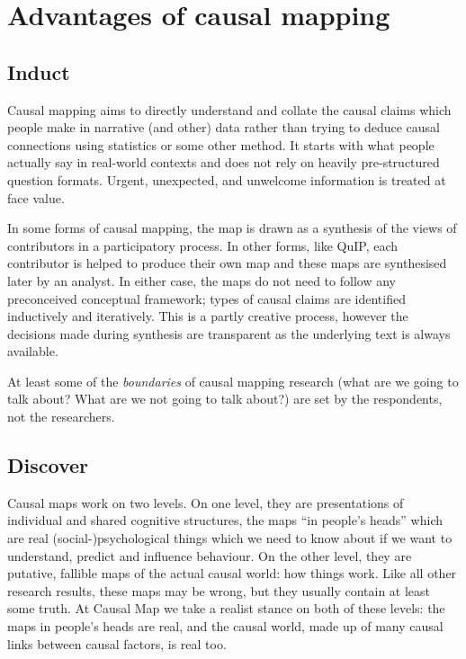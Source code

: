 \documentclass[
]{book}
\begin{document}
\hypertarget{advantages-of-causal-mapping}{%
\section{Advantages of causal mapping}\label{advantages-of-causal-mapping}}

\hypertarget{induct}{%
\subsection{Induct}\label{induct}}

Causal mapping aims to directly understand and collate the causal claims which people make in narrative (and other) data rather than trying to deduce causal connections using statistics or some other method. It starts with what people actually say in real-world contexts and does not rely on heavily pre-structured question formats. Urgent, unexpected, and unwelcome information is treated at face value.

In some forms of causal mapping, the map is drawn as a synthesis of the views of contributors in a participatory process. In other forms, like QuIP, each contributor is helped to produce their own map and these maps are synthesised later by an analyst. In either case, the maps do not need to follow any preconceived conceptual framework; types of causal claims are identified inductively and iteratively. This is a partly creative process, however the decisions made during synthesis are transparent as the underlying text is always available.

At least some of the \emph{boundaries} of causal mapping research (what are we going to talk about? What are we not going to talk about?) are set by the respondents, not the researchers.

\hypertarget{discover}{%
\subsection{Discover}\label{discover}}

Causal maps work on two levels. On one level, they are presentations of individual and shared cognitive structures, the maps ``in people's heads'' which are real (social-)psychological things which we need to know about if we want to understand, predict and influence behaviour. On the other level, they are putative, fallible maps of the actual causal world: how things work. Like all other research results, these maps may be wrong, but they usually contain at least some truth. At Causal Map we take a realist stance on both of these levels: the maps in people's heads are real, and the causal world, made up of many causal links between causal factors, is real too.
\end{document}
